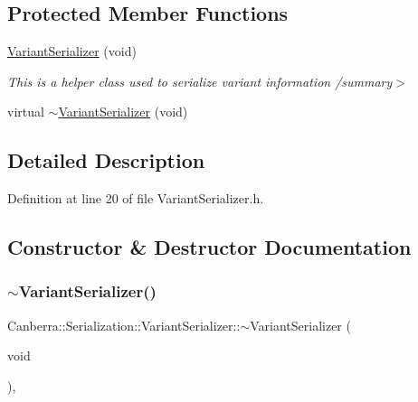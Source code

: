 \subsection*{Protected Member Functions}
\begin{DoxyCompactItemize}
\item 
\mbox{\label{class_canberra_1_1_serialization_1_1_variant_serializer_ace5a7ce4759a7d10094b97824dd08b38}} 
\hyperlink{class_canberra_1_1_serialization_1_1_variant_serializer_ace5a7ce4759a7d10094b97824dd08b38}{Variant\+Serializer} (void)
\begin{DoxyCompactList}\small\item\em This is a helper class used to serialize variant information /summary$>$ \end{DoxyCompactList}\item 
virtual \hyperlink{class_canberra_1_1_serialization_1_1_variant_serializer_a5612b5f7a015533433ab142325f065b8_a5612b5f7a015533433ab142325f065b8}{$\sim$\+Variant\+Serializer} (void)
\end{DoxyCompactItemize}


\subsection{Detailed Description}


Definition at line 20 of file Variant\+Serializer.\+h.



\subsection{Constructor \& Destructor Documentation}
\mbox{\label{class_canberra_1_1_serialization_1_1_variant_serializer_a5612b5f7a015533433ab142325f065b8_a5612b5f7a015533433ab142325f065b8}} 
\subsubsection{\texorpdfstring{$\sim$\+Variant\+Serializer()}{~VariantSerializer()}}
{\footnotesize\ttfamily Canberra\+::\+Serialization\+::\+Variant\+Serializer\+::$\sim$\+Variant\+Serializer (\begin{DoxyParamCaption}\item[{void}]{ }\end{DoxyParamCaption})\hspace{0.3cm}{\ttfamily [protected]}, {\ttfamily [virtual]}}

